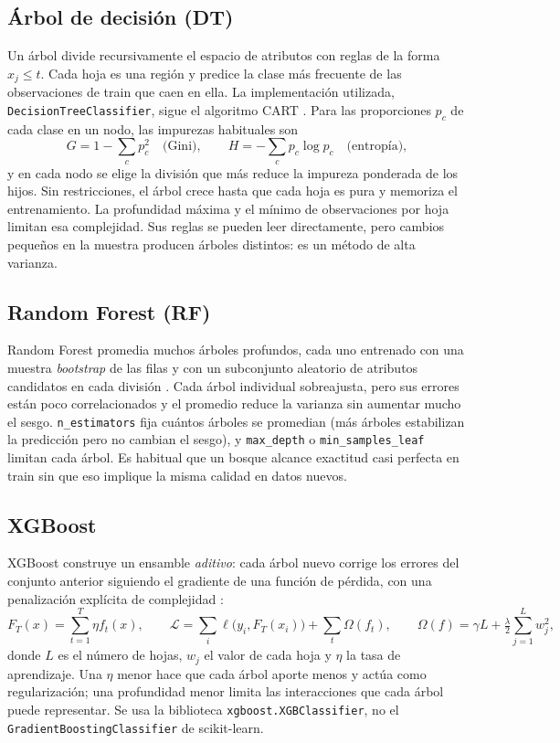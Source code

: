 \documentclass[11pt]{article}
\begin{document}
\subsection{Árbol de decisión (DT)}
Un árbol divide recursivamente el espacio de atributos con reglas de la forma
$x_j\le t$. Cada hoja es una región y predice la clase más frecuente de las
observaciones de train que caen en ella. La implementación utilizada,
\texttt{DecisionTreeClassifier}, sigue el algoritmo CART \cite{sklearntree}. Para las
proporciones $p_c$ de cada clase en un nodo, las impurezas habituales son
\[
 G=1-\sum_c p_c^2 \quad\text{(Gini)}, \qquad H=-\sum_c p_c\log p_c \quad\text{(entropía)},
\]
y en cada nodo se elige la división que más reduce la impureza ponderada de los
hijos. Sin restricciones, el árbol crece hasta que cada hoja es pura y memoriza el
entrenamiento. La profundidad máxima y el mínimo de observaciones por hoja limitan
esa complejidad. Sus reglas se pueden leer directamente, pero cambios pequeños en la
muestra producen árboles distintos: es un método de alta varianza.

\subsection{Random Forest (RF)}
Random Forest promedia muchos árboles profundos, cada uno entrenado con una muestra
\emph{bootstrap} de las filas y con un subconjunto aleatorio de atributos candidatos
en cada división \cite{breiman,sklearnensemble}. Cada árbol individual sobreajusta,
pero sus errores están poco correlacionados y el promedio reduce la varianza sin
aumentar mucho el sesgo. \texttt{n\_estimators} fija cuántos árboles se promedian
(más árboles estabilizan la predicción pero no cambian el sesgo), y
\texttt{max\_depth} o \texttt{min\_samples\_leaf} limitan cada árbol. Es habitual que
un bosque alcance exactitud casi perfecta en train sin que eso implique la misma
calidad en datos nuevos.

\subsection{XGBoost}
XGBoost construye un ensamble \emph{aditivo}: cada árbol nuevo corrige los errores
del conjunto anterior siguiendo el gradiente de una función de pérdida, con una
penalización explícita de complejidad \cite{chen,xgboostmodel}:
\[
 F_T(x)=\sum_{t=1}^{T}\eta f_t(x),\qquad
 \mathcal L=\sum_i\ell\bigl(y_i,F_T(x_i)\bigr)+\sum_t\Omega(f_t),
 \qquad \Omega(f)=\gamma L+\tfrac{\lambda}{2}\sum_{j=1}^{L}w_j^2,
\]
donde $L$ es el número de hojas, $w_j$ el valor de cada hoja y $\eta$ la tasa de
aprendizaje. Una $\eta$ menor hace que cada árbol aporte menos y actúa como
regularización; una profundidad menor limita las interacciones que cada árbol
puede representar. Se usa la biblioteca \texttt{xgboost.XGBClassifier}, no el
\texttt{GradientBoostingClassifier} de scikit-learn.
\end{document}
